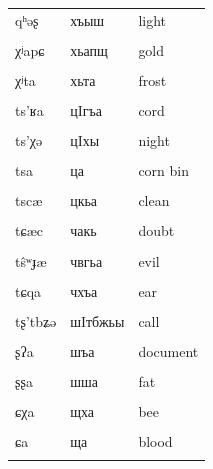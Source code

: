 \documentclass[
]{article}
\begin{document}
\begin{longtable}{l|l|l}
\hline
\cellcolor{gray!6}{qʰəχʲ} & \cellcolor{gray!6}{хъыхь} & \cellcolor{gray!6}{headache}\\
\hline
qʰəʂ & хъыш & light\\
\hline
\cellcolor{gray!6}{χə} & \cellcolor{gray!6}{хы} & \cellcolor{gray!6}{bullet}\\
\hline
χʲapɕ & хьапщ & gold\\
\hline
\cellcolor{gray!6}{χʲzə} & \cellcolor{gray!6}{хьзы} & \cellcolor{gray!6}{name}\\
\hline
χʲta & хьта & frost\\
\hline
\cellcolor{gray!6}{ts’ba} & \cellcolor{gray!6}{цIба} & \cellcolor{gray!6}{lack of something}\\
\hline
ts’ʁa & цIгъа & cord\\
\hline
\cellcolor{gray!6}{ts’da} & \cellcolor{gray!6}{цIда} & \cellcolor{gray!6}{cord}\\
\hline
ts’χə & цIхы & night\\
\hline
\cellcolor{gray!6}{ts’ɕɪ} & \cellcolor{gray!6}{цIщы} & \cellcolor{gray!6}{sole}\\
\hline
tsa & ца & corn bin\\
\hline
\cellcolor{gray!6}{tsba} & \cellcolor{gray!6}{цба} & \cellcolor{gray!6}{six}\\
\hline
tscæ & цкьа & clean\\
\hline
\cellcolor{gray!6}{tsχa} & \cellcolor{gray!6}{цха} & \cellcolor{gray!6}{honey}\\
\hline
tɕæc & чакь & doubt\\
\hline
\cellcolor{gray!6}{tŝʷʁʲɪ} & \cellcolor{gray!6}{чвгъьы} & \cellcolor{gray!6}{bull}\\
\hline
tŝʷɟæ & чвгьа & evil\\
\hline
\cellcolor{gray!6}{tŝʷcæɕ} & \cellcolor{gray!6}{чвкьащ} & \cellcolor{gray!6}{unfortunate}\\
\hline
tɕqa & чхъа & ear\\
\hline
\cellcolor{gray!6}{tɕ’ɪc} & \cellcolor{gray!6}{чыкь} & \cellcolor{gray!6}{shortish}\\
\hline
tʂ’tbʑə & шIтбжьы & call\\
\hline
\cellcolor{gray!6}{ŝʷχə} & \cellcolor{gray!6}{швхы} & \cellcolor{gray!6}{carrot}\\
\hline
ʂʔa & шъа & document\\
\hline
\cellcolor{gray!6}{ʂta} & \cellcolor{gray!6}{шта} & \cellcolor{gray!6}{motherland}\\
\hline
ʂʂa & шша & fat\\
\hline
\cellcolor{gray!6}{ɕta} & \cellcolor{gray!6}{щта} & \cellcolor{gray!6}{track}\\
\hline
ɕχa & щха & bee\\
\hline
\cellcolor{gray!6}{ɕqa} & \cellcolor{gray!6}{щхъа} & \cellcolor{gray!6}{pasture}\\
\hline
ɕa & ща & blood\\
\hline
\cellcolor{gray!6}{ɕʔa} & \cellcolor{gray!6}{щъа} & \cellcolor{gray!6}{prop}\\
\hline
\end{longtable}
\end{document}
